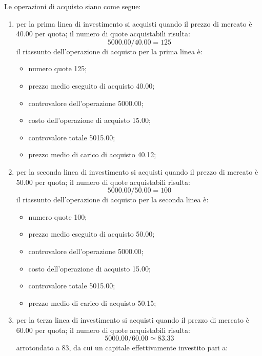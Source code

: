 \documentclass[12pt,a4paper]{article}
\newcommand{\Eur}[1]{\SI{#1}{\text{\euro{}}}}
\begin{document}
Le operazioni di acquisto siano come segue:
\begin{enumerate}
\item per la prima  linea di investimento si acquisti quando il prezzo  di mercato è \Eur{40,00} per
  quota; il numero di quote acquistabili risulta:
  \begin{equation*}
    \num{5000,00} / \num{40,00} = \num{125}
  \end{equation*}
  il riassunto dell'operazione di acquisto per la prima linea è:
  \begin{itemize}
  \item numero quote \num{125};
  \item prezzo medio eseguito di acquisto \Eur{40,00};
  \item controvalore dell'operazione \Eur{5000,00};
  \item costo dell'operazione di acquisto \Eur{15,00};
  \item controvalore totale \Eur{5015,00};
  \item prezzo medio di carico di acquisto \Eur{40,12};
  \end{itemize}
\item per la seconda linea di investimento si acquisti quando il prezzo di mercato è \Eur{50,00} per
  quota; il numero di quote acquistabili risulta:
  \begin{equation*}
    \num{5000,00} / \num{50,00} = \num{100}
  \end{equation*}
  il riassunto dell'operazione di acquisto per la seconda linea è:
  \begin{itemize}
  \item numero quote \num{100};
  \item prezzo medio eseguito di acquisto \Eur{50,00};
  \item controvalore dell'operazione \Eur{5000,00};
  \item costo dell'operazione di acquisto \Eur{15,00};
  \item controvalore totale \Eur{5015,00};
  \item prezzo medio di carico di acquisto \Eur{50,15};
  \end{itemize}
\item per la terza  linea di investimento si acquisti quando il prezzo  di mercato è \Eur{60,00} per
  quota; il numero di quote acquistabili risulta:
  \begin{equation*}
    \num{5000,00} / \num{60,00} \simeq{} \num{83,33}
  \end{equation*}
  arrotondato a \num{83}, da cui un capitale effettivamente investito pari a:

\end{enumerate}
\end{document}
